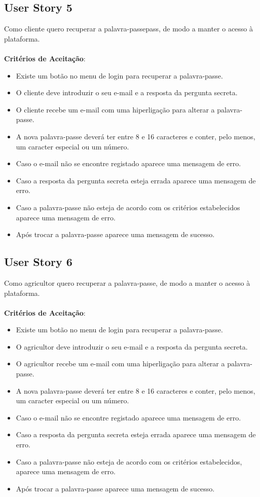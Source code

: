 \documentclass[a4paper,11pt]{article}
\begin{document}
\subsection{User Story 5}
Como cliente quero recuperar a palavra-passepass, de modo a manter o acesso à plataforma.\\\\
\textbf{Critérios de Aceitação}:
\begin{itemize}
  \item Existe um botão no menu de login para recuperar a palavra-passe.
  \item O cliente deve introduzir o seu e-mail e a resposta da pergunta secreta.
  \item O cliente recebe um e-mail com uma hiperligação para alterar a palavra-passe.
  \item A nova palavra-passe deverá ter entre 8 e 16 caracteres e conter, pelo menos, um caracter especial ou um número.
  \item Caso o e-mail não se encontre registado aparece uma mensagem de erro.
  \item Caso a resposta da pergunta secreta esteja errada aparece uma mensagem de erro.
  \item Caso a palavra-passe não esteja de acordo com os critérios estabelecidos aparece uma mensagem de erro.
  \item Após trocar a palavra-passe aparece uma mensagem de sucesso.
\end{itemize}
\subsection{User Story 6}
Como agricultor quero recuperar a palavra-passe, de modo a manter o acesso à plataforma.\\\\
\textbf{Critérios de Aceitação}:
\begin{itemize}
  \item Existe um botão no menu de login para recuperar a palavra-passe.
  \item O agricultor deve introduzir o seu e-mail e a resposta da pergunta secreta.
  \item O agricultor recebe um e-mail com uma hiperligação para alterar a palavra-passe.
  \item A nova palavra-passe deverá ter entre 8 e 16 caracteres e conter, pelo menos, um caracter especial ou um número.
  \item Caso o e-mail não se encontre registado aparece uma mensagem de erro.
  \item Caso a resposta da pergunta secreta esteja errada aparece uma mensagem de erro.
  \item Caso a palavra-passe não esteja de acordo com os critérios estabelecidos, aparece uma mensagem de erro.
  \item Após trocar a palavra-passe aparece uma mensagem de sucesso.
\end{itemize}
\end{document}
